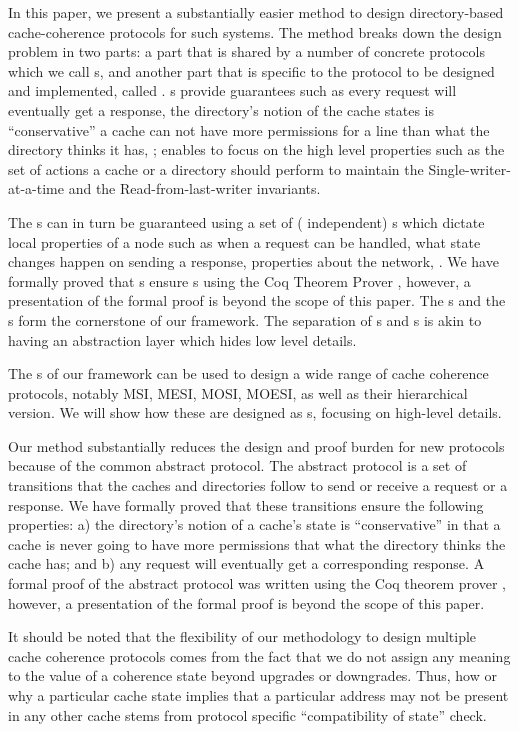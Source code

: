 In this paper, we present a substantially easier method to design directory-based cache-coherence protocols for such systems. The method breaks down the design problem in two parts: a part that is shared by a number of concrete protocols which we call \glob{}s, and another part that is specific to the protocol to be designed and implemented, called \policy{}. \glob{}s provide guarantees such as every request will eventually get a response, the directory's notion of the cache states is ``conservative'' \ie a cache can not have more permissions for a line than what the directory thinks it has, \etc; \glob{} enables \policy{} to focus on the high level properties such as the set of actions a cache or a directory should perform to maintain the Single-writer-at-a-time and the Read-from-last-writer invariants.

The \glob{}s can in turn be guaranteed using a set of (\policy{} independent) \local{}s which dictate local properties of a node such as when a request can be handled, what state changes happen on sending a response, properties about the network, \etc. We have formally proved that \local{}s ensure \glob{}s using the Coq Theorem Prover \cite{}, however, a presentation of the formal proof is beyond the scope of this paper. The \glob{}s and the \local{}s form the cornerstone of our framework. The separation of \glob{}s and \local{}s is akin to having an abstraction layer which hides low level details.

The \glob{}s of our framework can be used to design a wide range of cache coherence protocols, notably MSI, MESI, MOSI, MOESI, as well as their hierarchical version. We will show how these are designed as \policy{}s, focusing on high-level details.

Our method substantially reduces the design and proof burden for new protocols because of the common abstract protocol. The abstract protocol is a set of transitions that the caches and directories follow to send or receive a request or a response. We have formally proved that these transitions ensure the following properties: a) the directory's notion of a cache's state is ``conservative'' in that a cache is never going to have more permissions that what the directory thinks the cache has; and b) any request will eventually get a corresponding response. A formal proof of the abstract protocol was written using the Coq theorem prover \cite{}, however, a presentation of the formal proof is beyond the scope of this paper.

It should be noted that the flexibility of our methodology to design multiple cache coherence protocols comes from the fact that we do not assign any meaning to the value of a coherence state beyond upgrades or downgrades. Thus, how or why a particular cache state implies that a particular address may not be present in any other cache stems from protocol specific ``compatibility of state'' check. 

